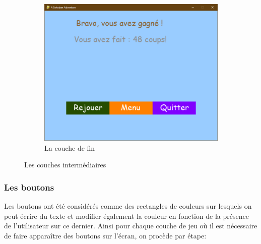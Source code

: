 \documentclass[a4paper,12pt]{article} %
\begin{document}
\begin{figure}[!ht]
\begin{subfigure}[b]{0.3\textwidth}
		\includegraphics[width=\textwidth]{images/Capture_104740.png}
		\caption{La couche de fin}
	\end{subfigure}
	\caption{Les couches intermédiaires}
\end{figure}
	

\subsubsection{Les boutons} 

Les boutons ont été considérés comme des rectangles de couleurs sur lesquels on peut écrire du texte et modifier également la couleur en fonction de la présence de l'utilisateur sur ce dernier.
\newline
Ainsi pour chaque couche de jeu où il est nécessaire de faire apparaître des boutons sur l'écran, on procède par étape:
\end{document}
